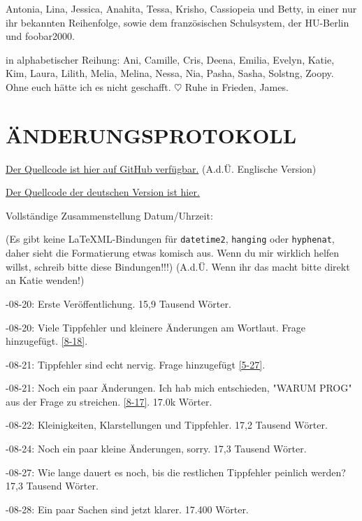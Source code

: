 \documentclass{article}
\begin{document}
 Antonia, Lina, Jessica, Anahita, Tessa, Krisho, Cassiopeia und Betty, in einer nur ihr bekannten Reihenfolge, sowie dem französischen Schulsystem, der HU-Berlin und foobar2000.

in alphabetischer Reihung: Ani, Camille, Cris, Deena, Emilia, Evelyn, Katie, Kim, Laura, Lilith, Melia, Melina, Nessa, Nia, Pasha, Sasha, Solstng, Zoopy. Ohne euch hätte ich es nicht geschafft. $\heartsuit$  Ruhe in Frieden, James.

\section*{ÄNDERUNGSPROTOKOLL}

\noindent \href{https://github.com/Juicysteak117/pghrt/}{Der Quellcode ist hier auf GitHub verfügbar.} (A.d.Ü. Englische Version)

\noindent \href{https://github.com/synthie-cat/pghrt-de}{Der Quellcode der deutschen Version ist hier.}

\noindent Vollständige Zusammenstellung Datum/Uhrzeit: \DTMnow

\noindent(Es gibt keine LaTeXML-Bindungen für \texttt{datetime2}, \texttt{hanging} oder \texttt{hyphenat}, daher sieht die Formatierung etwas komisch aus. Wenn du mir wirklich helfen willst, schreib bitte diese Bindungen!!!) (A.d.Ü. Wenn ihr das macht bitte direkt an Katie wenden!)

-08-20: Erste Veröffentlichung. 15,9 Tausend Wörter.

-08-20: Viele Tippfehler und kleinere Änderungen am Wortlaut. Frage hinzugefügt. \ref{8-18}.

-08-21: Tippfehler sind echt nervig. Frage hinzugefügt \ref{5-27}.

-08-21: Noch ein paar Änderungen. Ich hab mich entschieden, "WARUM PROG" aus der Frage zu streichen. \ref{8-17}. 17.0k Wörter.

-08-22: Kleinigkeiten, Klarstellungen und Tippfehler. 17,2 Tausend Wörter.

-08-24: Noch ein paar kleine Änderungen, sorry. 17,3 Tausend Wörter.

-08-27: Wie lange dauert es noch, bis die restlichen Tippfehler peinlich werden? 17,3 Tausend Wörter.

-08-28: Ein paar Sachen sind jetzt klarer. 17.400 Wörter.
\end{document}
